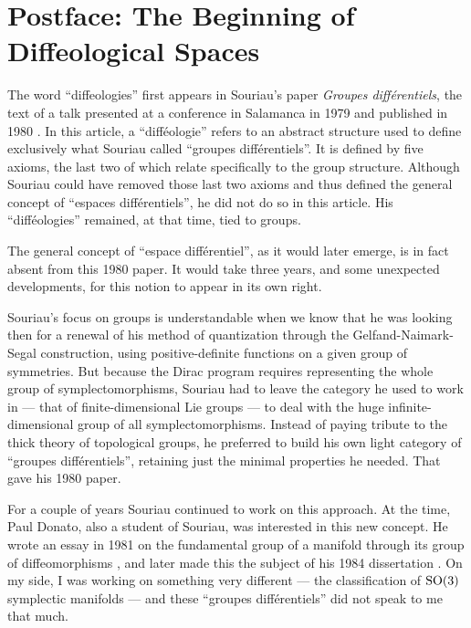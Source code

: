 
\backmatter

\cleardoublepage
\chapter*{Postface: The Beginning of Diffeological Spaces}
\setcounter{footnote}{0}


The word ``diffeologies'' first appears in Souriau's paper {\em Groupes différentiels},
the text of a talk presented at a conference in Salamanca in 1979 and published in 1980 \cite{Sou80}.
In this article,
a ``difféologie'' refers to an abstract structure used to define exclusively what Souriau called ``groupes différentiels''.
It is defined by five axioms,
the last two of which relate specifically to the group structure.
Although Souriau could have removed those last two axioms and thus defined the general concept of ``espaces différentiels'',
he did not do so in this article.
His ``difféologies'' remained, at that time, tied to groups.

The general concept of ``espace différentiel'',
as it would later emerge,
is in fact absent from this 1980 paper.
It would take three years,
and some unexpected developments,
for this notion to appear in its own right.

Souriau's focus on groups is understandable when we know that
he was looking then for a renewal of his method of quantization
through the Gelfand-Naimark-Segal construction,
using positive-definite functions on a given group of symmetries.
But because the Dirac program requires representing
the whole group of symplectomorphisms,
Souriau had to leave the category he used to work in
--- that of finite-dimensional Lie groups ---
to deal with the huge infinite-dimensional group of all symplectomorphisms.
Instead of paying tribute to the thick theory of topological groups,
he preferred to build his own light category of
``groupes différentiels'', retaining just the minimal properties he needed.
That gave his 1980 paper.

For a couple of years Souriau continued to work on this approach.
At the time,
Paul Donato, also a student of Souriau,
was interested in this new concept.
He wrote an essay in 1981 on the fundamental group of a manifold
through its group of diffeomorphisms \cite{Don81},
and later made this the subject of his 1984 dissertation \cite{Don84}.
On my side, I was working on something very different ---
the classification of $\mathrm{SO}(3)$ symplectic manifolds ---
and these ``groupes différentiels'' did not speak to me that much.

